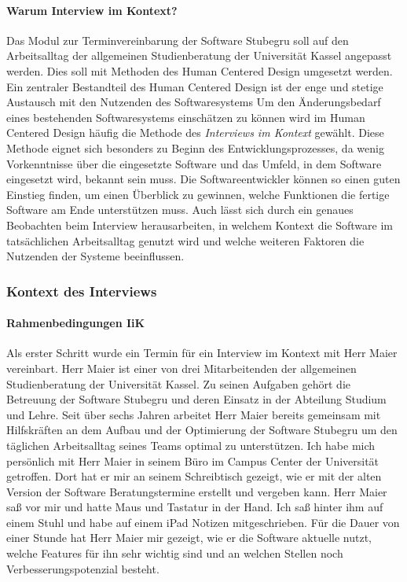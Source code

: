 \documentclass[12pt]{article}
\newcommand{\ipName}{Herr Maier }
\begin{document}
\paragraph{Warum Interview im Kontext?}
Das Modul zur Terminvereinbarung der Software Stubegru soll auf den
Arbeitsalltag der allgemeinen Studienberatung der Universität Kassel angepasst
werden. Dies soll mit Methoden des Human Centered Design umgesetzt werden. Ein
zentraler Bestandteil des Human Centered Design ist der enge und stetige
Austausch mit den Nutzenden des Softwaresystems \cite{hci}  Um den Änderungsbedarf eines bestehenden Softwaresystems einschätzen
zu können wird im Human Centered Design häufig die Methode des
\textit{Interviews im Kontext} gewählt.\cite{contextualDesign} Diese Methode
eignet sich besonders zu Beginn des Entwicklungsprozesses, da wenig
Vorkenntnisse über die eingesetzte Software und das Umfeld, in dem Software
eingesetzt wird, bekannt sein muss. Die Softwareentwickler können so einen
guten Einstieg finden, um einen Überblick zu gewinnen, welche Funktionen die
fertige Software am Ende unterstützen muss. Auch lässt sich durch ein genaues
Beobachten beim Interview herausarbeiten, in welchem Kontext die Software im
tatsächlichen Arbeitsalltag genutzt wird und welche weiteren Faktoren die
Nutzenden der Systeme beeinflussen.

\subsubsection{Kontext des Interviews}

\paragraph{Rahmenbedingungen IiK}
Als erster Schritt wurde ein Termin für ein Interview im Kontext mit \ipName
{} vereinbart. \ipName ist einer von drei
Mitarbeitenden der allgemeinen Studienberatung der Universität Kassel. Zu
seinen Aufgaben gehört die Betreuung der Software Stubegru und deren Einsatz in
der Abteilung Studium und Lehre. Seit über sechs Jahren arbeitet \ipName
bereits gemeinsam mit Hilfskräften an dem Aufbau und der Optimierung der
Software Stubegru um den täglichen Arbeitsalltag seines Teams optimal zu
unterstützen. Ich habe mich persönlich mit \ipName in seinem Büro im Campus
Center der Universität getroffen. Dort hat er mir an seinem Schreibtisch
gezeigt, wie er mit der alten Version der Software Beratungstermine erstellt
und vergeben kann. \ipName saß vor mir und hatte Maus und Tastatur in der Hand.
Ich saß hinter ihm auf einem Stuhl und habe auf einem iPad Notizen
mitgeschrieben. Für die Dauer von einer Stunde hat \ipName mir gezeigt, wie er
die Software aktuelle nutzt, welche Features für ihn sehr wichtig sind und an
welchen Stellen noch Verbesserungspotenzial besteht.
\end{document}
